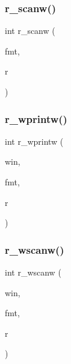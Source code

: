 \mbox{\label{C-macros_8c_ae894ccf3428f2f98a5a10a654b34180a}} 
\subsubsection{\texorpdfstring{r\+\_\+scanw()}{r\_scanw()}}
{\footnotesize\ttfamily int r\+\_\+scanw (\begin{DoxyParamCaption}\item[{char $\ast$}]{fmt,  }\item[{float $\ast$}]{r }\end{DoxyParamCaption})}

\mbox{\label{C-macros_8c_a6eb29a28c7477bd1f35254a66f43a4c7}} 
\subsubsection{\texorpdfstring{r\+\_\+wprintw()}{r\_wprintw()}}
{\footnotesize\ttfamily int r\+\_\+wprintw (\begin{DoxyParamCaption}\item[{W\+I\+N\+D\+OW $\ast$}]{win,  }\item[{const char $\ast$}]{fmt,  }\item[{float}]{r }\end{DoxyParamCaption})}

\mbox{\label{C-macros_8c_a8e85ec34aaf96f801923ac941e9435c4}} 
\subsubsection{\texorpdfstring{r\+\_\+wscanw()}{r\_wscanw()}}
{\footnotesize\ttfamily int r\+\_\+wscanw (\begin{DoxyParamCaption}\item[{W\+I\+N\+D\+OW $\ast$}]{win,  }\item[{char $\ast$}]{fmt,  }\item[{float $\ast$}]{r }\end{DoxyParamCaption})}

